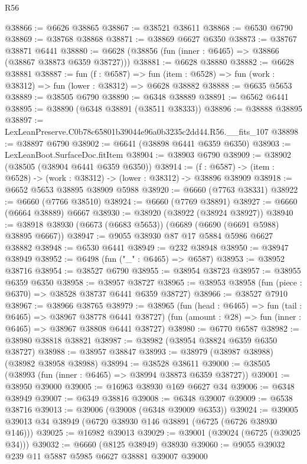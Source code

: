 \begin{lexlean}{R56}
\begin{coremodule}
@38866 := @6626 @38865
@38867 := @38521 @38611
@38868 := @6530 @6790
@38869 := @38768 @38868
@38871 := @38869 @6627 @6350
@38873 := @38767 @38871 @6441
@38880 := @6628 (@38856 (fun (inner : @6465) => @38866 (@38867 @38873 @6359 @38727)))
@38881 := @6628 @38880
@38882 := @6628 @38881
@38887 := fun (f : @6587) =>
  fun (item : @6528) => fun (work : @38312) => fun (lower : @38312) => @6628 @38882
@38888 := @6635 @5653
@38889 := @38505 @6790
@38890 := @6348 @38889
@38891 := @6562 @6441
@38895 := @38890 (@6348 @38891 (@38511 @38333))
@38896 := @38888 @38895
@38897 := LexLeanPreserve.C0b78c65801b39044e96a0b3235c2dd44.R56.__fits_107
@38898 := @38897 @6790
@38902 := @6641 (@38898 @6441 @6359 @6350)
@38903 := LexLeanBoot.SurfaceDoc.fitItem
@38904 := @38903 @6790
@38909 := @38902 (@38505 (@38904 @6441 @6359 @6350))
@38914 := (f : @6587) -> (item : @6528) -> (work : @38312) -> (lower : @38312) -> @38896 @38909
@38918 := @6652 @5653 @38895 @38909 @5988
@38920 := @6660 (@7763 @38331)
@38922 := @6660 (@7766 @38510)
@38924 := @6660 (@7769 @38891)
@38927 := @6660 (@6664 @38889) @6667
@38930 := @38920 (@38922 (@38924 @38927))
@38940 := @38918 @38930 (@6673 (@6683 @5653)) (@6689 (@6690 (@6691 @5988) @38895 @6667))
@38947 := @9055 @38930 @87 @17 @5884 @5986 @6627 @38882
@38948 := @6530 @6441
@38949 := @232 @38948
@38950 := @38947 @38949
@38952 := @6498 (fun ("_" : @6465) => @6587)
@38953 := @38952 @38716
@38954 := @38527 @6790
@38955 := @38954 @38723
@38957 := @38955 @6359 @6350
@38958 := @38957 @38727
@38965 := @38953 @38958 (fun (piece : @6370) => @38528 @38737 @6441 @6359 @38727)
@38966 := @38527 @7910
@38967 := @38966 @38765
@38979 := @38965
    (fun (head : @6465) => fun (tail : @6465) => @38967 @38778 @6441 @38727)
    (fun (amount : @28) => fun (inner : @6465) => @38967 @38808 @6441 @38727)
@38980 := @6770 @6587
@38982 := @38980 @38818 @38821
@38987 := @38982 (@38954 @38824 @6359 @6350 @38727)
@38988 := @38957 @38847
@38993 := @38979 (@38987 @38988) (@38982 @38958 @38988)
@38994 := @38528 @38611
@39000 := @38505 (@38993 (fun (inner : @6465) => @38994 @38873 @6359 @38727))
@39001 := @38950 @39000
@39005 := @16963 @38930 @169 @6627 @34
@39006 := @6348 @38949
@39007 := @6349 @38816
@39008 := @6348 @39007
@39009 := @6538 @38716
@39013 := @39006 (@39008 (@6348 @39009 @6353))
@39024 := @39005 @39013 @34 @38949 (@6720 @38930 @146 @38891 (@6725 (@6726 @38930 @146)))
@39025 := @16982 @39013
@39029 := @39001 (@39024 (@6725 (@39025 @34)))
@39032 := @6660 (@8125 @38949) @38930
@39060 := @9055
    @39032
    @239
    @11
    @5887
    @5985
    @6627
    @38881
    @39007
    @39000

\end{coremodule}
\end{lexlean}
